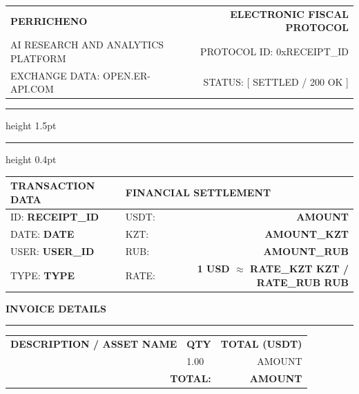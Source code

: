 \documentclass[7pt,a4paper]{extarticle}
\begin{document}
\sloppy

\noindent
\begin{tabularx}{\textwidth}{@{} X r @{}}
    \textbf{\fontsize{24pt}{24pt}\selectfont PERRICHENO} & {\fontsize{8pt}{8pt}\selectfont \textbf{ELECTRONIC FISCAL PROTOCOL}} \\
    {\fontsize{8pt}{8pt}\selectfont AI RESEARCH AND ANALYTICS PLATFORM} & {\fontsize{8pt}{8pt}\selectfont PROTOCOL ID: 0x{{RECEIPT_ID}}} \\
    {\fontsize{8pt}{8pt}\selectfont EXCHANGE DATA: OPEN.ER-API.COM} & {\fontsize{8pt}{8pt}\selectfont STATUS: [ SETTLED / 200 OK ]}
\end{tabularx}

\vspace{3mm}
\hrule height 1.5pt
\vspace{0.5mm}
\hrule height 0.4pt
\vspace{6mm}

\noindent
\renewcommand{\arraystretch}{2.2}
\begin{tabularx}{\textwidth}{@{} p{6.5cm} X r @{}}
    \textbf{TRANSACTION DATA} & \multicolumn{2}{l}{\textbf{FINANCIAL SETTLEMENT}} \\
    \hline
    \fontsize{7.5pt}{8pt}\selectfont ID: \textbf{{{RECEIPT_ID}}} & \fontsize{7.5pt}{8pt}\selectfont USDT: & \textbf{\large {{AMOUNT}}} \\
    \fontsize{7.5pt}{8pt}\selectfont DATE: \textbf{{{DATE}}} & \fontsize{7.5pt}{8pt}\selectfont KZT: & \textbf{\large {{AMOUNT_KZT}}} \\
    \fontsize{7.5pt}{8pt}\selectfont USER: \textbf{{{USER_ID}}} & \fontsize{7.5pt}{8pt}\selectfont RUB: & \textbf{\large {{AMOUNT_RUB}}} \\
    \fontsize{7.5pt}{8pt}\selectfont TYPE: \textbf{{{TYPE}}} & \fontsize{7.5pt}{8pt}\selectfont RATE: & \fontsize{7pt}{7pt}\selectfont \textbf{1 USD $\approx$ {{RATE_KZT}} KZT / {{RATE_RUB}} RUB} \\
\end{tabularx}

\vspace{8mm}

\noindent
{\fontsize{7pt}{7pt}\selectfont \textbf{INVOICE DETAILS}} \\
\vspace{-1.5mm}
\noindent\hrule
\vspace{2mm}
\noindent
\renewcommand{\arraystretch}{1.5}
\begin{tabularx}{\textwidth}{@{} X l r @{}}
    \textbf{DESCRIPTION / ASSET NAME} & \textbf{QTY} & \textbf{TOTAL (USDT)} \\
    {\fontsize{9pt}{9pt}\selectfont {{PACK_NAME}}} & 1.00 & {{AMOUNT}} \\
    \hline
    \multicolumn{2}{r}{\textbf{TOTAL:}} & \textbf{\huge {{AMOUNT}}} \\
\end{tabularx}
\end{document}

